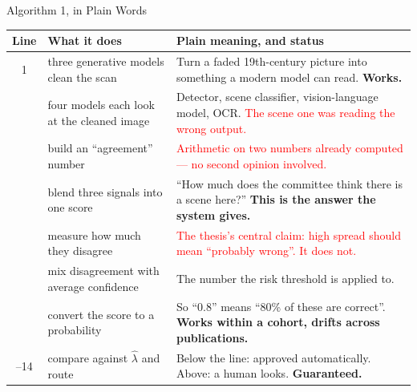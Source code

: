 \documentclass[aspectratio=169,11pt]{beamer}
\begin{document}
\begin{frame}{Algorithm 1, in Plain Words}
\tiny
\begin{center}
\begin{tabular}{@{}c p{4.0cm} p{6.4cm}@{}}
\toprule
\textbf{Line} & \textbf{What it does} & \textbf{Plain meaning, and status} \\
\midrule
1 & three generative models clean the scan & Turn a faded 19th-century picture into something a modern model can read. \textbf{Works.} \\
\addlinespace
2 & four models each look at the cleaned image & Detector, scene classifier, vision-language model, OCR. \textcolor{red}{The scene one was reading the wrong output.} \\
\addlinespace
3 & build an ``agreement'' number & \textcolor{red}{Arithmetic on two numbers already computed --- no second opinion involved.} \\
\addlinespace
4 & blend three signals into one score & ``How much does the committee think there is a scene here?'' \textbf{This is the answer the system gives.} \\
\addlinespace
5 & measure how much they disagree & \textcolor{red}{The thesis's central claim: high spread should mean ``probably wrong''. It does not.} \\
\addlinespace
7 & mix disagreement with average confidence & The number the risk threshold is applied to. \\
\addlinespace
8 & convert the score to a probability & So ``0.8'' means ``80\% of these are correct''. \textbf{Works within a cohort, drifts across publications.} \\
\addlinespace
10--14 & compare against $\hat\lambda$ and route & Below the line: approved automatically. Above: a human looks. \textbf{Guaranteed.} \\
\bottomrule
\end{tabular}
\end{center}
\end{frame}
\end{document}
